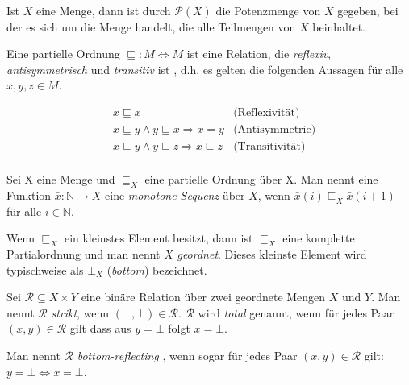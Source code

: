 
Ist $X$ eine Menge, dann ist durch $\mathcal{P}(X)$ die Potenzmenge von $X$ gegeben, bei der es sich um die Menge handelt, die alle Teilmengen von $X$ beinhaltet.


Eine partielle Ordnung $\sqsubseteq : M \Leftrightarrow M$ ist eine Relation, die \textit{reflexiv}, \textit{antisymmetrisch} und \textit{transitiv} ist , d.h. es gelten die folgenden Aussagen für alle $x, y, z \in M$.

\begin{align*}
& x \sqsubseteq x & \text{(Reflexivität)} \\
& x \sqsubseteq y \land y \sqsubseteq x \Rightarrow x = y & \text{(Antisymmetrie)} \\
& x \sqsubseteq y \land y \sqsubseteq z \Rightarrow x \sqsubseteq z & \text{(Transitivität)} \\
\end{align*}

Sei X eine Menge und $\sqsubseteq_{X}$ eine partielle Ordnung über X. Man nennt eine Funktion $\bar{x} : \mathbb{N} \rightarrow X$
eine \textit{monotone Sequenz} über $X$, wenn $\bar{x}(i) \sqsubseteq_{X} \bar{x}(i + 1)$ für alle $i \in \mathbb{N}$.

Wenn $\sqsubseteq_{X}$ ein kleinstes Element besitzt, dann ist $\sqsubseteq_{X}$ eine komplette Partialordnung und man nennt $X$
\textit{geordnet}. Dieses kleinste Element wird typischweise als $\bot_{X}$ (\textit{bottom}) bezeichnet.

Sei $\mathcal{R} \subseteq X \times Y$ eine binäre Relation über zwei geordnete Mengen $X$ und $Y$. Man nennt $\mathcal{R}$ \textit{strikt},
wenn $(\bot, \bot) \in \mathcal{R}$. $\mathcal{R}$ wird \textit{total} genannt, wenn für jedes Paar $(x, y) \in \mathcal{R}$ gilt dass
aus $y = \bot$ folgt $x = \bot$.

Man nennt $\mathcal{R}$ \textit{bottom-reflecting} , wenn sogar für jedes Paar
$(x, y) \in \mathcal{R}$ gilt: $y = \bot \Leftrightarrow x = \bot$.


